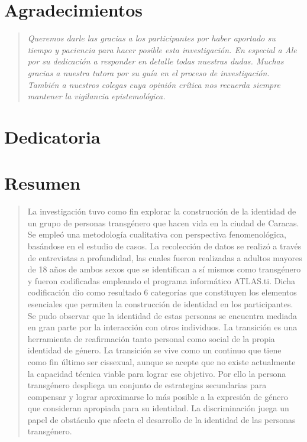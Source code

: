 \chapter{Agradecimientos}

\begin{quotation}
\flushright\textsl{
Queremos darle las gracias a los participantes por haber aportado su tiempo y
paciencia para hacer posible esta investigación. En especial a Ale por su
dedicación a responder en detalle todas nuestras dudas. Muchas gracias a
nuestra tutora por su guía en el proceso de investigación. También a nuestros
colegas cuya opinión crítica nos recuerda siempre mantener la vigilancia
epistemológica.
}
\end{quotation}


\chapter{Dedicatoria}

\chapter{Resumen}

\begin{quote}
\small
La investigación tuvo como fin explorar la construcción de la identidad de un
grupo de personas transgénero que hacen vida en la ciudad de Caracas. Se empleó
una metodología cualitativa con perspectiva fenomenológica, basándose en el
estudio de casos. La recolección de datos se realizó a través de entrevistas a
profundidad, las cuales fueron realizadas a adultos mayores de 18 años de ambos
sexos que se identifican a sí mismos como transgénero y fueron codificadas
empleando el programa informático ATLAS.ti\@. Dicha codificación dio como
resultado 6 categorías que constituyen los elementos esenciales que permiten la
construcción de identidad en los participantes. Se pudo observar que la
identidad de estas personas se encuentra mediada en gran parte por la
interacción con otros individuos. La transición es una herramienta de
reafirmación tanto personal como social de la propia identidad de género. La
transición se vive como un continuo que tiene como fin último ser cissexual,
aunque se acepte que no existe actualmente la capacidad técnica viable para
lograr ese objetivo. Por ello la persona transgénero despliega un conjunto de
estrategias secundarias para compensar y lograr aproximarse lo más posible a la
expresión de género que consideran apropiada para su identidad. La
discriminación juega un papel de obstáculo que afecta el desarrollo de la
identidad de las personas transgénero.
\end{quote}

